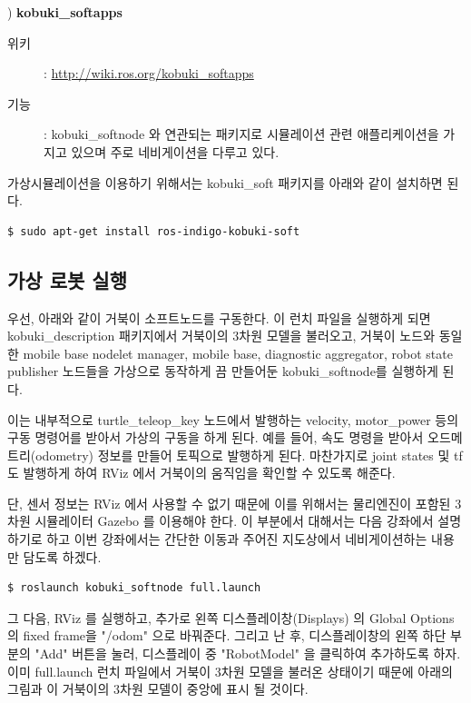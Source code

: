 \vspace{\baselineskip}
\noindent{}
\thenum) \textbf{kobuki\_softapps}
\begin{description}
\item[위키]: \url{http://wiki.ros.org/kobuki_softapps}
\item[기능]: kobuki\_softnode 와 연관되는 패키지로 시뮬레이션 관련 애플리케이션을 가지고 있으며 주로 네비게이션을 다루고 있다.
\end{description}

가상시뮬레이션을 이용하기 위해서는 kobuki\_soft 패키지를 아래와 같이 설치하면 된다.

\vspace{\baselineskip}
\begin{lstlisting}[language=ROS]
$ sudo apt-get install ros-indigo-kobuki-soft
\end{lstlisting}

\subsection{가상 로봇 실행}

우선, 아래와 같이 거북이 소프트노드를 구동한다. 이 런치 파일을 실행하게 되면 kobuki\_description 패키지에서 거북이의 3차원 모델을 불러오고, 거북이 노드와 동일한 mobile base nodelet manager, mobile base, diagnostic aggregator, robot state publisher 노드들을 가상으로 동작하게 끔 만들어둔 kobuki\_softnode를 실행하게 된다.

이는 내부적으로 turtle\_teleop\_key 노드에서 발행하는 velocity, motor\_power 등의 구동 명령어를 받아서 가상의 구동을 하게 된다. 예를 들어, 속도 명령을 받아서 오드메트리(odometry) 정보를 만들어 토픽으로 발행하게 된다. 마찬가지로 joint states 및 tf 도 발행하게 하여 RViz 에서 거북이의 움직임을 확인할 수 있도록 해준다.

단, 센서 정보는 RViz 에서 사용할 수 없기 때문에 이를 위해서는 물리엔진이 포함된 3차원 시뮬레이터 Gazebo 를 이용해야 한다.  이 부분에서 대해서는 다음 강좌에서 설명하기로 하고 이번 강좌에서는 간단한 이동과 주어진 지도상에서 네비게이션하는 내용만 담도록 하겠다.
 
\vspace{\baselineskip}
\begin{lstlisting}[language=ROS]
$ roslaunch kobuki_softnode full.launch
\end{lstlisting}

그 다음, RViz 를 실행하고, 추가로 왼쪽 디스플레이창(Displays) 의 Global Options 의 fixed frame을 "/odom" 으로 바꿔준다. 그리고 난 후, 디스플레이창의 왼쪽 하단 부분의 "Add" 버튼을 눌러, 디스플레이 중 "RobotModel" 을 클릭하여 추가하도록 하자. 이미 full.launch 런치 파일에서 거북이 3차원 모델을 불러온 상태이기 때문에 아래의 그림과 이 거북이의 3차원 모델이 중앙에 표시 될 것이다.

